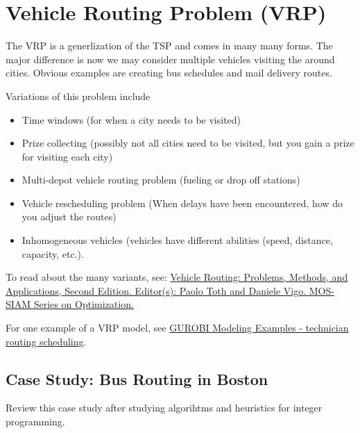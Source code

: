 \section{Vehicle Routing Problem (VRP)}

The VRP is a generlization of the TSP and comes in many many forms.  The major difference is now we may consider multiple vehicles visiting the around cities.
Obvious examples are creating bus schedules and mail delivery routes.  

Variations of this problem include
\begin{itemize}
\item Time windows (for when a city needs to be visited)
\item Prize collecting (possibly not all cities need to be visited, but you gain a prize for visiting each city)
\item Multi-depot vehicle routing problem (fueling or drop off stations)
\item Vehicle rescheduling problem (When delays have been encountered, how do you adjust the routes)
\item Inhomogeneous vehicles (vehicles have different abilities (speed, distance, capacity, etc.).
\end{itemize}

To read about the many variants, see:
\href{https://doi-org.ezproxy.lib.vt.edu/10.1137/1.9781611973594}{
Vehicle Routing: Problems, Methods, and Applications, Second Edition. 
Editor(s): Paolo Toth and Daniele Vigo.  MOS-SIAM Series on Optimization.}


For one example of a VRP model, see \href{https://github.com/Gurobi/modeling-examples/tree/master/technician_routing_scheduling}{GUROBI Modeling Examples - technician routing scheduling}.


\subsection{Case Study: Bus Routing in Boston}
Review this case study after studying algorihtms and heuristics for integer programming.


